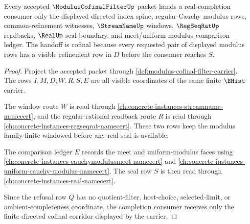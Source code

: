 \begin{theorem}
\label{thm:modulus-cofinal-filter-regular-cauchy-handoff}
Every accepted $\ModulusCofinalFilterUp$ packet hands a real-completion consumer only the displayed directed index spine, regular-Cauchy modulus rows, common-refinement witnesses, $\StreamNameUp$ windows, $\RegSeqRatUp$ readbacks, $\RealUp$ seal boundary, and meet/uniform-modulus comparison ledger. The handoff is cofinal because every requested pair of displayed modulus rows has a visible refinement row in $D$ before the consumer reaches $S$.
\end{theorem}
\begin{proof}
Project the accepted packet through \autoref{def:modulus-cofinal-filter-carrier}. The rows $I,M,D,W,R,S,E$ are all visible coordinates of the same finite $\BHist$ carrier.

The window route $W$ is read through \autoref{ch:concrete-instances-streamname-namecert}, and the regular-rational readback route $R$ is read through \autoref{ch:concrete-instances-regseqrat-namecert}. These two rows keep the modulus family finite-windowed before any real seal is available.

The comparison ledger $E$ records the meet and uniform-modulus faces using \autoref{ch:concrete-instances-cauchymodulusmeet-namecert} and \autoref{ch:concrete-instances-uniform-cauchy-modulus-namecert}. The seal row $S$ is then read through \autoref{ch:concrete-instances-real-namecert}.

Since the refusal row $Q$ has no quotient-filter, host-choice, selected-limit, or ambient-completeness coordinate, the completion consumer receives only the finite directed cofinal corridor displayed by the carrier.
\end{proof}

